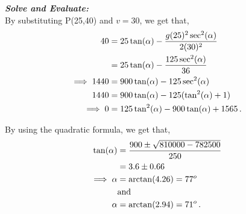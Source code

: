 \begin{subquestions}
    
    
    
\textbf{\textit{Solve and Evaluate:}} \\
By substituting P(25,40) and $v=30$, we get that,
\begin{align}
	40 & = 25\tan(\alpha) - \frac{g(25)^2\sec^2(\alpha)}{2(30)^2} \nonumber \\
	 & = 25\tan(\alpha) - \frac{125\sec^2(\alpha)}{36} \nonumber \\
	 \implies 1440 & = 900\tan(\alpha) -125\sec^2(\alpha) \nonumber \\
	 1440 & = 900\tan(\alpha) -125(\tan^2(\alpha)+1) \nonumber \\
	 \implies 0 & = 125\tan^2(\alpha)-900\tan(\alpha) + 1565 \,.
\end{align}
  
By using the quadratic formula, we get that,
\begin{align}
	\tan(\alpha) & = \frac{900 \pm \sqrt{810000-782500}}{250} \nonumber \\
	             & = 3.6 \pm 0.66 \nonumber \\
	             \implies \alpha & = \arctan(4.26) = 77^o \nonumber \\
	             & \text{and} \nonumber \\
	             \alpha & = \arctan(2.94) = 71^o \,.
\end{align}


















	
\end{subquestions}